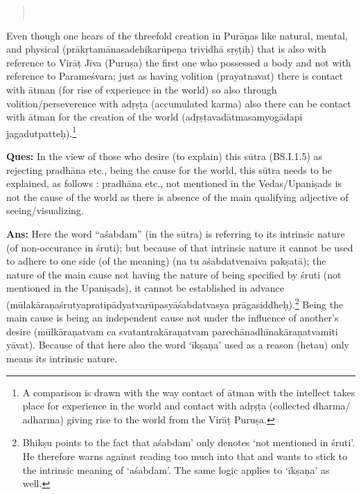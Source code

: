 \begin{verse}
\\
\end{verse}

Even though one hears of the threefold creation in Purāṇas  like natural, mental, and physical (prākṛtamānasadehikarūpeṇa trividhā sṛṣṭiḥ) that is also with reference to Virāṭ Jīva (Puruṣa) the first one who possessed a body and not with reference to Parameśvara; just as having volition  (prayatnavat) there is contact with ātman (for rise of experience in the world) so also through volition/perseverence with adṛṣṭa (accumulated karma) also there can be contact with ātman for the creation of the world (adṛṣṭavadātmasamyogādapi jagadutpatteḥ).\footnote{A comparison is drawn with the way contact of ātman with the intellect takes place for experience in the world and contact with adṛṣṭa (collected dharma/ adharma) giving rise to the world from the Virāṭ Puruṣa.} 

\textbf{Ques:} In the view of those who desire (to explain) this sūtra (BS.I.1.5) as rejecting pradhāna etc., being the cause for the world, this sūtra needs to be explained, as follows : pradhāna etc., not mentioned in the Vedas/Upaniṣads is not the cause of the world as there is absence of the main qualifying adjective of seeing/visualizing. 

\textbf{Ans:} Here the word “aśabdam” (in the sūtra) is referring to its intrinsic nature (of non-occurance in śruti); but because of  that intrinsic nature it cannot be used to adhere to one side (of the meaning) (na tu aśabdatvenaiva pakṣatā); the nature of the main cause not having the nature of being specified by śruti (not mentioned in the Upaniṣads), it cannot be established in advance (mūlakāraṇaśrutyapratipādyatvarūpasyāśabdatvasya prāgasiddheḥ).\footnote{Bhikṣu points to the fact that aśabdam’ only denotes ‘not mentioned in śruti’. He therefore warns against reading too much into that and wants to stick to the intrinsic meaning of ‘aśabdam’. The same logic applies to ‘īkṣaṇa’ as well.} Being the main cause is being an independent cause not under the influence of another’s desire (mūlkā\-raṇatvam ca svatantrakāraṇatvam parechānadhīnakāraṇatvamiti yāvat). Because of that here also the word ‘īkṣaṇa’ used as a reason (hetau) only means its intrinsic nature. 

